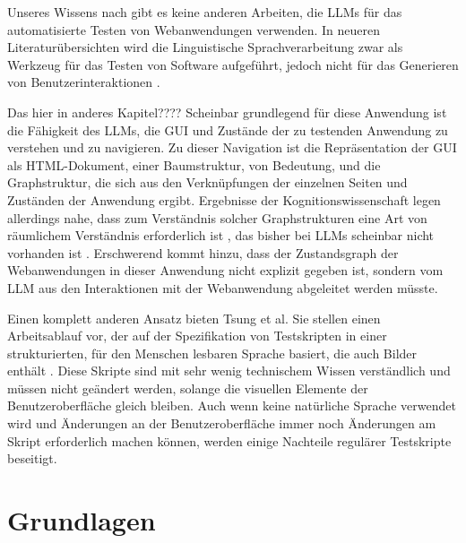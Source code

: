Unseres Wissens nach gibt es keine anderen Arbeiten, die LLMs für das automatisierte Testen von Webanwendungen verwenden.
In neueren Literaturübersichten wird die Linguistische Sprachverarbeitung zwar als Werkzeug für das Testen von Software aufgeführt, jedoch nicht für das Generieren von Benutzerinteraktionen \cite{implementation_verma_2023, machine_fontes_2021}.

Das hier in anderes Kapitel????
Scheinbar grundlegend für diese Anwendung ist die Fähigkeit des LLMs, die GUI und Zustände der zu testenden Anwendung zu verstehen und zu navigieren.
Zu dieser Navigation ist die Repräsentation der GUI als HTML-Dokument, einer Baumstruktur, von Bedeutung, und die Graphstruktur, die sich aus den Verknüpfungen der einzelnen Seiten und Zuständen der Anwendung ergibt.
Ergebnisse der Kognitionswissenschaft legen allerdings nahe, dass zum Verständnis solcher Graphstrukturen eine Art von räumlichem Verständnis erforderlich ist \cite{what_is_a_cognitive_map}, das bisher bei LLMs scheinbar nicht vorhanden ist \cite{cogmaps_llm}.
Erschwerend kommt hinzu, dass der Zustandsgraph der Webanwendungen in dieser Anwendung nicht explizit gegeben ist, sondern vom LLM aus den Interaktionen mit der Webanwendung abgeleitet werden müsste.

Einen komplett anderen Ansatz bieten Tsung et al.
Sie stellen einen Arbeitsablauf vor, der auf der Spezifikation von Testskripten in einer strukturierten, für den Menschen lesbaren Sprache basiert, die auch Bilder enthält \cite{tsung}.
Diese Skripte sind mit sehr wenig technischem Wissen verständlich und müssen nicht geändert werden, solange die visuellen Elemente der Benutzeroberfläche gleich bleiben.
Auch wenn keine natürliche Sprache verwendet wird und Änderungen an der Benutzeroberfläche immer noch Änderungen am Skript erforderlich machen können, werden einige Nachteile regulärer Testskripte beseitigt.

\chapter{Grundlagen}
\label{ch:Foundations}

